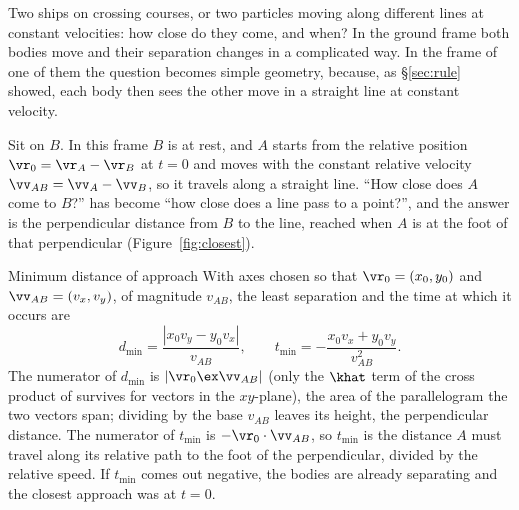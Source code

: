 Two ships on crossing courses, or two particles moving along different lines at constant velocities:
how close do they come, and when? In the ground frame both bodies move and their separation changes in
a complicated way. In the frame of one of them the question becomes simple geometry, because, as
\S\ref{sec:rule} showed, each body then sees the other move in a straight line at constant velocity.

Sit on $B$. In this frame $B$ is at rest, and $A$ starts from the relative position
$\vr_0=\vr_A-\vr_B$ at $t=0$ and moves with the constant relative velocity $\vv_{AB}=\vv_A-\vv_B$, so
it travels along a straight line. ``How close does $A$ come to $B$?'' has become ``how close does a line
pass to a point?'', and the answer is the perpendicular distance from $B$ to the line, reached when $A$
is at the foot of that perpendicular (Figure~\ref{fig:closest}).

\begin{keybox}{Minimum distance of approach}
With axes chosen so that $\vr_0=(x_0,y_0)$ and $\vv_{AB}=(v_x,v_y)$, of magnitude $v_{AB}$, the least
separation and the time at which it occurs are
\[
d_{\min}=\frac{|x_0v_y-y_0v_x|}{v_{AB}},\qquad t_{\min}=-\frac{x_0v_x+y_0v_y}{v_{AB}^2}.
\]
The numerator of $d_{\min}$ is $|\vr_0\ex\vv_{AB}|$ (only the $\khat$ term of the cross product of
 survives for vectors in the $xy$-plane), the area of the parallelogram the two vectors span; dividing by the base $v_{AB}$ leaves its height, the perpendicular distance. The
numerator of $t_{\min}$ is $-\vr_0\cdot\vv_{AB}$, so $t_{\min}$ is the distance $A$ must travel along its
relative path to the foot of the perpendicular, divided by the relative speed. If $t_{\min}$ comes out
negative, the bodies are already separating and the closest approach was at $t=0$.
\end{keybox}

\begin{figure}[htbp]
\centering
{}
\end{figure}

